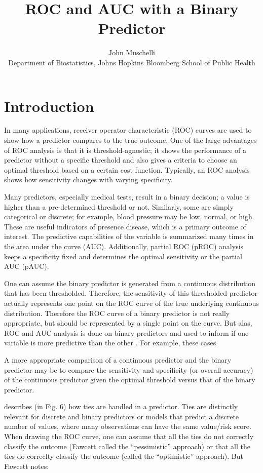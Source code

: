 \documentclass[article]{jss}
\author{
John Muschelli\\Department of Biostatistics, Johns Hopkins Bloomberg School of Public
Health
}
\title{ROC and AUC with a Binary Predictor}
\begin{document}
\hypertarget{introduction}{%
\section{Introduction}\label{introduction}}

In many applications, receiver operator characteristic (ROC) curves are
used to show how a predictor compares to the true outcome. One of the
large advantages of ROC analysis is that it is threshold-agnostic; it
shows the performance of a predictor without a specific threshold and
also gives a criteria to choose an optimal threshold based on a certain
cost function. Typically, an ROC analysis shows how sensitivity changes
with varying specificity.

Many predictors, especially medical tests, result in a binary decision;
a value is higher than a pre-determined threshold or not. Similarly,
some are simply categorical or discrete; for example, blood pressure may
be low, normal, or high. These are useful indicators of presence
disease, which is a primary outcome of interest. The predictive
capabilities of the variable is summarized many times in the area under
the curve (AUC). Additionally, partial ROC (pROC) analysis keeps a
specificity fixed and determines the optimal sensitivity or the partial
AUC (pAUC).

One can assume the binary predictor is generated from a continuous
distribution that has been thresholded. Therefore, the sensitivity of
this thresholded predictor actually represents one point on the ROC
curve of the true underlying continuous distribution. Therefore the ROC
curve of a binary predictor is not really appropriate, but should be
represented by a single point on the curve. But alas, ROC and AUC
analysis is done on binary predictors and used to inform if one variable
is more predictive than the other \citep[\citet{jama2}]{jama}. For
example, these cases

A more appropriate comparison of a continuous predictor and the binary
predictor may be to compare the sensitivity and specificity (or overall
accuracy) of the continuous predictor given the optimal threshold versus
that of the binary predictor.

\citet{fawcett2006introduction} describes (in Fig. 6) how ties are
handled in a predictor. Ties are distinctly relevant for discrete and
binary predictors or models that predict a discrete number of values,
where many observations can have the same value/risk score. When drawing
the ROC curve, one can assume that all the ties do not correctly
classify the outcome (Fawcett called the ``pessimistic'' approach) or
that all the ties do correclty classify the outcome (called the
``optimistic'' approach). But Fawcett notes:
\end{document}
